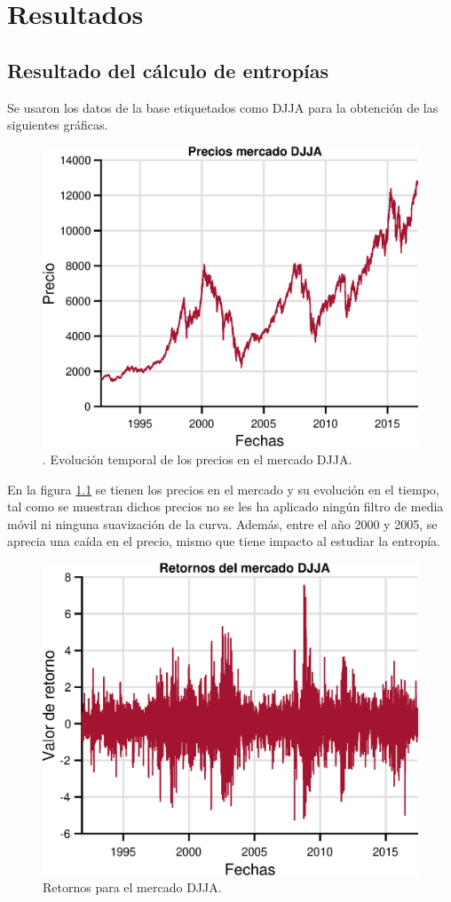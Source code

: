 %
\chapter{Resultados}
\label{Resultados}




\section{Resultado del cálculo de entropías}

Se usaron los datos de la base etiquetados como DJJA para la obtención de las siguientes gráficas. 





\begin{figure}
	\centering
	\includegraphics[width=0.7\linewidth]{figures/precioseps}
	\caption{. Evolución temporal de los precios en el mercado DJJA.}
	\label{precioseps}
\end{figure}

En la figura  \ref{precioseps} se tienen los precios en el mercado y su evolución en el tiempo, tal como se muestran dichos precios no se les ha aplicado ningún filtro de media móvil ni ninguna suavización de la curva. Además, entre el año 2000 y 2005, se aprecia una caída en el precio, mismo que tiene impacto al estudiar la entropía.

\begin{figure}
	\centering
	\includegraphics[width=0.7\linewidth]{figures/onlyreturnseps}
	\caption{Retornos para el mercado DJJA.}
	\label{onlyreturnseps}
\end{figure}

